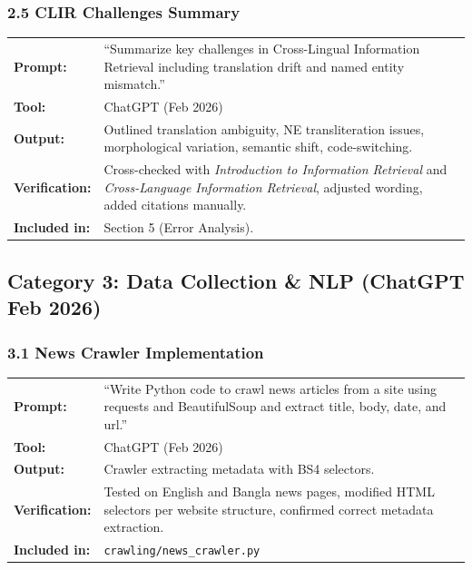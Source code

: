 \documentclass[12pt,a4paper]{article}
\begin{document}
\subsubsection*{2.5 CLIR Challenges Summary}
\begin{tabular}{p{3.2cm}p{9.5cm}}
\textbf{Prompt:}        & ``Summarize key challenges in Cross-Lingual Information Retrieval including translation drift and named entity mismatch.'' \\
\textbf{Tool:}          & ChatGPT (Feb 2026) \\
\textbf{Output:}        & Outlined translation ambiguity, NE transliteration issues, morphological variation, semantic shift, code-switching. \\
\textbf{Verification:}  & Cross-checked with \textit{Introduction to Information Retrieval} and \textit{Cross-Language Information Retrieval}, adjusted wording, added citations manually. \\
\textbf{Included in:}   & Section 5 (Error Analysis). \\
\end{tabular}

\subsection*{Category 3: Data Collection \& NLP (ChatGPT Feb 2026)}

\subsubsection*{3.1 News Crawler Implementation}
\begin{tabular}{p{3.2cm}p{9.5cm}}
\textbf{Prompt:}        & ``Write Python code to crawl news articles from a site using requests and BeautifulSoup and extract title, body, date, and url.'' \\
\textbf{Tool:}          & ChatGPT (Feb 2026) \\
\textbf{Output:}        & Crawler extracting metadata with BS4 selectors. \\
\textbf{Verification:}  & Tested on English and Bangla news pages, modified HTML selectors per website structure, confirmed correct metadata extraction. \\
\textbf{Included in:}   & \texttt{crawling/news\_crawler.py} \\
\end{tabular}
\end{document}

